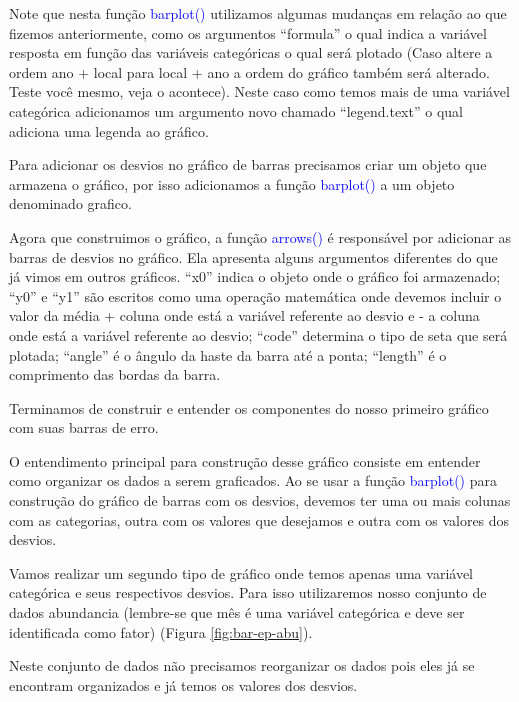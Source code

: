 \documentclass[titlepage, oneside, openany, a4paper]{book}
\begin{document}
Note que nesta função \textcolor{blue}{barplot()} utilizamos algumas mudanças em relação ao que fizemos anteriormente, como os argumentos ``formula'' o qual indica a variável resposta em função das variáveis categóricas o qual será plotado (Caso altere a ordem ano + local para local + ano a ordem do gráfico também será alterado. Teste você mesmo, veja o acontece). Neste caso como temos mais de uma variável categórica adicionamos um argumento novo chamado ``legend.text'' o qual adiciona uma legenda ao gráfico.

Para adicionar os desvios no gráfico de barras precisamos criar um objeto que armazena o gráfico, por isso adicionamos a função \textcolor{blue}{barplot()} a um objeto denominado grafico.

Agora que construimos o gráfico, a função \textcolor{blue}{arrows()} é responsável por adicionar as barras de desvios no gráfico. Ela apresenta alguns argumentos diferentes do que já vimos em outros gráficos. ``x0'' indica o objeto onde o gráfico foi armazenado; ``y0'' e ``y1'' são escritos como uma operação matemática onde devemos incluir o valor da média + coluna onde está a variável referente ao desvio e - a coluna onde está a variável referente ao desvio; ``code'' determina o tipo de seta que será plotada; ``angle'' é o ângulo da haste da barra até a ponta; ``length'' é o comprimento das bordas da barra.

Terminamos de construir e entender os componentes do nosso primeiro gráfico com suas barras de erro.

O entendimento principal para construção desse gráfico consiste em entender como organizar os dados a serem graficados. Ao se usar a função \textcolor{blue}{barplot()} para construção do gráfico de barras com os desvios, devemos ter uma ou mais colunas com as categorias, outra com os valores que desejamos e outra com os valores dos desvios.

Vamos realizar um segundo tipo de gráfico onde temos apenas uma variável categórica e seus respectivos desvios. Para isso utilizaremos nosso conjunto de dados abundancia (lembre-se que mês é uma variável categórica e deve ser identificada como fator) (Figura \ref{fig:bar-ep-abu}).

Neste conjunto de dados não precisamos reorganizar os dados pois eles já se encontram organizados e já temos os valores dos desvios.
\end{document}

